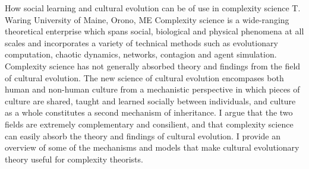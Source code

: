 
    \begin{abstract_online}{How social learning and cultural evolution can be of use in complexity science}{%
        T. Waring}{%
        }{%
        University of Maine, Orono, ME}
    Complexity science is a wide-ranging theoretical enterprise which spans social, biological and physical phenomena at all scales and incorporates a variety of technical methods such as evolutionary computation, chaotic dynamics, networks, contagion and agent simulation. Complexity science has not generally absorbed theory and findings from the field of cultural evolution. The new science of cultural evolution encompases both human and non-human culture from a mechanistic perspective in which pieces of culture are shared, taught and learned socially between individuals, and culture as a whole constitutes a second mechanism of inheritance. I argue that the two fields are extremely complementary and consilient, and that complexity science can easily absorb the theory and findings of cultural evolution. I provide an overview of some of the mechanisms and models that make cultural evolutionary theory useful for complexity theorists. 
    
    \end{abstract_online}
    